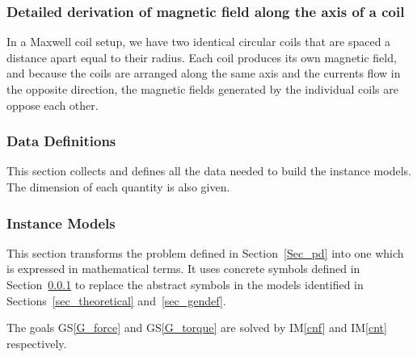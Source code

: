 \documentclass[12pt]{article}
\newcommand{\gsref}[1]{GS\ref{#1}}
\newcommand{\iref}[1]{IM\ref{#1}}
\begin{document}
\subsubsection*{Detailed derivation of magnetic field along the axis of a coil }
In a Maxwell coil setup, we have two identical circular coils that are spaced a distance apart equal to their radius. Each coil produces its own magnetic field, and because the coils are arranged along the same axis and the currents flow in the opposite direction, the magnetic fields generated by the individual coils are oppose each other.

\subsubsection{Data Definitions}\label{sec_datadef}

This section collects and defines all the data needed to build the instance
models. The dimension of each quantity is also given. 
~\newline

\subsubsection{Instance Models} \label{sec_instance}    

This section transforms the problem defined in Section~\ref{Sec_pd} into 
one which is expressed in mathematical terms. It uses concrete symbols defined 
in Section~\ref{sec_datadef} to replace the abstract symbols in the models 
identified in Sections~\ref{sec_theoretical} and~\ref{sec_gendef}.

The goals \gsref{G_force} and \gsref{G_torque} are solved by \iref{cnf} and \iref{cnt} respectively.

~\newline

\end{document}
